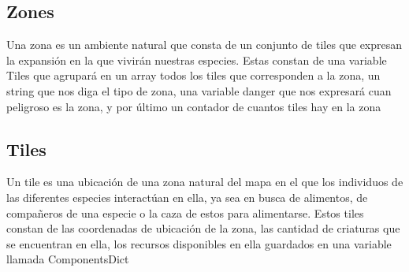 \documentclass{llncs}
\begin{document}
\subsection{Zones}
Una zona es un ambiente natural que consta de un conjunto de tiles que expresan la expansión en la que vivirán nuestras especies.
\newline
\newline
Estas constan de una variable Tiles que agrupará en un array todos los tiles que corresponden a la zona, un string que nos diga el tipo de zona, una variable danger que nos expresará cuan peligroso es la zona, y por último un contador de cuantos tiles hay en la zona


\subsection{Tiles}
Un tile es una ubicación de una zona natural del mapa en el que los individuos de las diferentes especies interactúan en ella, ya sea en busca de alimentos, de compañeros de una especie o la caza de estos para alimentarse.
\newline
\newline
Estos tiles constan de las coordenadas de ubicación de la zona, las cantidad de criaturas que se encuentran en ella, los recursos disponibles en ella guardados en una variable llamada ComponentsDict
\end{document}

